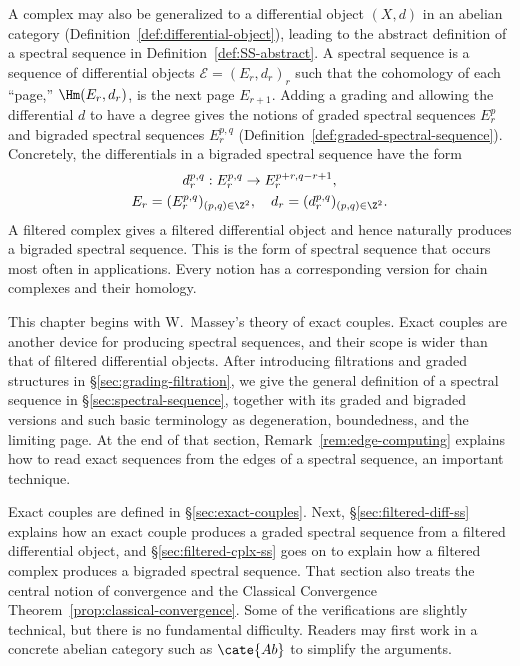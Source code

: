 A complex may also be generalized to a differential object $(X,d)$ in an
abelian category (Definition~\ref{def:differential-object}), leading to the
abstract definition of a spectral sequence in
Definition~\ref{def:SS-abstract}. A spectral sequence is a sequence of
differential objects $\mathscr{E}=(E_r,d_r)_r$ such that the cohomology of each
``page,'' $\Hm(E_r,d_r)$, is the next page $E_{r+1}$. Adding a grading and
allowing the differential $d$ to have a degree gives the notions of graded
spectral sequences $E_r^p$ and bigraded spectral sequences $E_r^{p,q}$
(Definition~\ref{def:graded-spectral-sequence}). Concretely, the differentials
in a bigraded spectral sequence have the form
\begin{gather*}
	d_r^{p, q}: E_r^{p, q} \to E_r^{p+r, q-r+1}, \\
	E_r = (E_r^{p, q})_{(p, q) \in \Z^2}, \quad d_r = (d_r^{p, q})_{(p, q) \in \Z^2}.
\end{gather*}
A filtered complex gives a filtered differential object and hence naturally
produces a bigraded spectral sequence. This is the form of spectral sequence
that occurs most often in applications. Every notion has a corresponding
version for chain complexes and their homology.

This chapter begins with W.\ Massey's theory of exact couples. Exact couples
are another device for producing spectral sequences, and their scope is wider
than that of filtered differential objects. After introducing filtrations and
graded structures in \S\ref{sec:grading-filtration}, we give the general
definition of a spectral sequence in \S\ref{sec:spectral-sequence}, together
with its graded and bigraded versions and such basic terminology as
degeneration, boundedness, and the limiting page. At the end of that section,
Remark~\ref{rem:edge-computing} explains how to read exact sequences from the
edges of a spectral sequence, an important technique.

Exact couples are defined in \S\ref{sec:exact-couples}. Next,
\S\ref{sec:filtered-diff-ss} explains how an exact couple produces a graded
spectral sequence from a filtered differential object, and
\S\ref{sec:filtered-cplx-ss} goes on to explain how a filtered complex produces
a bigraded spectral sequence. That section also treats the central notion of
convergence and the Classical Convergence Theorem~\ref{prop:classical-convergence}.
Some of the verifications are slightly technical, but there is no fundamental
difficulty. Readers may first work in a concrete abelian category such as
$\cate{Ab}$ to simplify the arguments.


